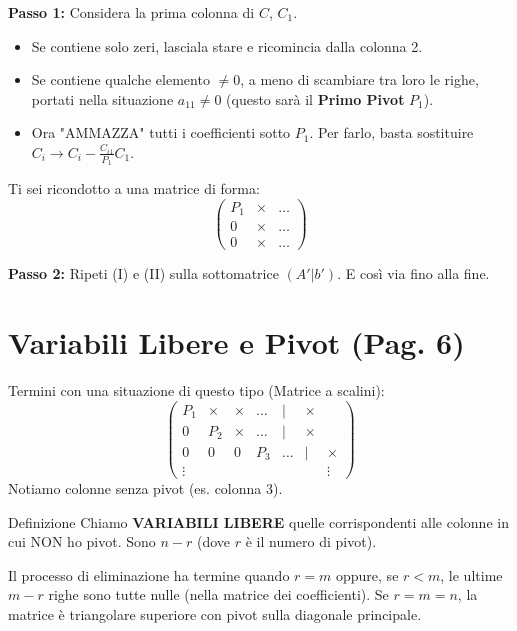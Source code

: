 \textbf{Passo 1:}
Considera la prima colonna di $C$, $C_1$.
\begin{itemize}
    \item Se contiene solo zeri, lasciala stare e ricomincia dalla colonna 2.
    \item Se contiene qualche elemento $\neq 0$, a meno di scambiare tra loro le righe, portati nella situazione $a_{11} \neq 0$ (questo sarà il \textbf{Primo Pivot} $P_1$).
    \item Ora "AMMAZZA" tutti i coefficienti sotto $P_1$. Per farlo, basta sostituire $C_i \to C_i - \frac{C_{i1}}{P_1} C_1$.
\end{itemize}
Ti sei ricondotto a una matrice di forma:
\[
\begin{pmatrix}
P_1 & \times & \dots \\
0 & \times & \dots \\
0 & \times & \dots
\end{pmatrix}
\]

\textbf{Passo 2:}
Ripeti (I) e (II) sulla sottomatrice $(A'|b')$.
E così via fino alla fine.

\section{Variabili Libere e Pivot (Pag. 6)}

Termini con una situazione di questo tipo (Matrice a scalini):
\[
\begin{pmatrix}
P_1 & \times & \times & \dots & | & \times \\
0 & P_2 & \times & \dots & | & \times \\
0 & 0 & 0 & P_3 & \dots & | & \times \\
\vdots & & & & & & \vdots
\end{pmatrix}
\]
Notiamo colonne senza pivot (es. colonna 3).
\begin{note}{Definizione}{}
Chiamo \textbf{VARIABILI LIBERE} quelle corrispondenti alle colonne in cui NON ho pivot.
Sono $n-r$ (dove $r$ è il numero di pivot).
\end{note}

Il processo di eliminazione ha termine quando $r=m$ oppure, se $r<m$, le ultime $m-r$ righe sono tutte nulle (nella matrice dei coefficienti).
Se $r=m=n$, la matrice è triangolare superiore con pivot sulla diagonale principale.

